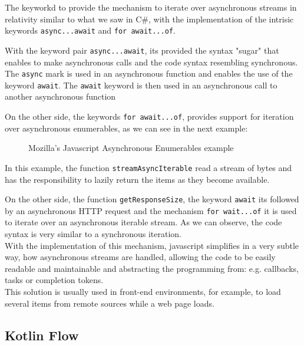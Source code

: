 	The keyworkd to provide the mechanism to iterate over asynchronous streams in relativity similar to what we saw in C\#, with the implementation of the intrisic keywords \texttt{async...await} and \texttt{for await...of}.

	With the keyword pair \texttt{async...await}, its provided the syntax "sugar" that enables to make asynchronous calls and the code syntax resembling synchronous. 
	The \texttt{async} mark is used in an asynchronous function and enables the use of the keyword \texttt{await}. The \texttt{await} keyword is then used in an asynchronous call to another asynchronous function

	On the other side, the keywords \texttt{for await...of}, provides support for iteration over asynchronous enumerables, as we can see in the next example:

	\begin{figure}[H]
		\centering
		\caption{Mozilla's Javascript Asynchronous Enumerables example}
		\label{fig:enumex2}
	\end{figure}

In this example, the function \texttt{streamAsyncIterable} read a stream of bytes and has the responsibility to lazily return the items as they become available.

On the other side, the function \texttt{getResponseSize}, the keyword \texttt{await} its followed by an asynchronous HTTP request and the mechanism \texttt{for wait...of} it is used to iterate over an asynchronous iterable stream. As we can observe, the code syntax is very similar to a synchronous iteration. \\

With the implementation of this mechanism, javascript simplifies in a very subtle way, how asynchronous streams are handled, allowing the code to be easily readable and maintainable and abstracting the programming from: e.g. callbacks, tasks or completion tokens.\\

This solution is usually used in front-end environments, for example, to load several items from remote sources while a web page loads.
\clearpage

\subsection{Kotlin Flow}

